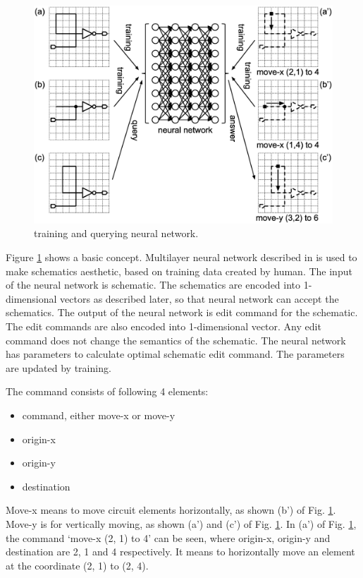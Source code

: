 \documentclass[twocolumn]{article}
\begin{document}
\begin{figure}[tb]
 \begin{center}
  \begin{minipage}{\hsize}
   \includegraphics[width=\hsize]{fig/nn_schem_01.eps}
   \caption{training and querying neural network.}
   \label{fig:nn_schem}
  \end{minipage}
 \end{center}
\end{figure}


Figure \ref{fig:nn_schem} shows a basic concept.
Multilayer neural network described in \cite{mit} is used
to make schematics aesthetic, based on training data created by human.
The input of the neural network is schematic.
The schematics are encoded into 1-dimensional vectors as described later,
so that neural network can accept the schematics.
The output of the neural network is edit command for the schematic.
The edit commands are also encoded into 1-dimensional vector.
Any edit command does not change the semantics of the schematic.
The neural network has parameters to calculate optimal schematic edit command.
The parameters are updated by training.

The command consists of following 4 elements:
\begin{itemize}
\item command, either move-x or move-y
\item origin-x
\item origin-y
\item destination
\end{itemize}
Move-x means to move circuit elements horizontally, as shown (b')
of Fig. \ref{fig:nn_schem}.
Move-y is for vertically moving, as shown (a') and (c')
of Fig. \ref{fig:nn_schem}.
In (a') of Fig. \ref{fig:nn_schem}, 
the command `move-x (2, 1) to 4' can be seen,
where origin-x, origin-y and destination are 2, 1 and 4 respectively.
It means to horizontally move an element at the coordinate (2, 1) to (2, 4).
\end{document}

